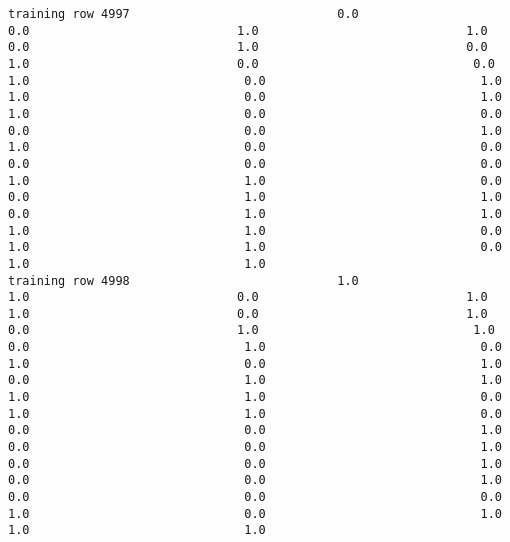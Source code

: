 \documentclass[11pt]{article}
\begin{document}
\begin{verbatim}
training row 4997                             0.0                             0.0                             1.0                             1.0                             0.0                             1.0                             0.0                             1.0                             0.0                              0.0                              1.0                              0.0                              1.0                              1.0                              0.0                              1.0                              1.0                              0.0                              0.0                              0.0                              0.0                              1.0                              1.0                              0.0                              0.0                              0.0                              0.0                              0.0                              1.0                              1.0                              0.0                              0.0                              1.0                              1.0                              0.0                              1.0                              1.0                              1.0                              1.0                              0.0                              1.0                              1.0                              0.0                              1.0                              1.0
training row 4998                             1.0                             1.0                             0.0                             1.0                             1.0                             0.0                             1.0                             0.0                             1.0                              1.0                              0.0                              1.0                              0.0                              1.0                              0.0                              1.0                              0.0                              1.0                              1.0                              1.0                              1.0                              0.0                              1.0                              1.0                              0.0                              0.0                              0.0                              1.0                              0.0                              0.0                              1.0                              0.0                              0.0                              1.0                              0.0                              0.0                              1.0                              0.0                              0.0                              0.0                              1.0                              0.0                              1.0                              1.0                              1.0

\end{verbatim}
\end{document}

